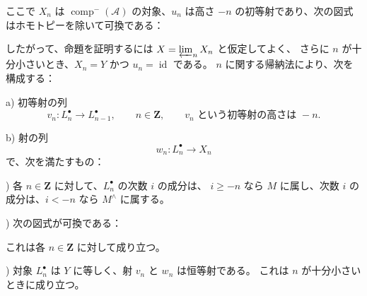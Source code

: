 \clearpage
{}%
\begingroup\small\setlength{\parskip}{0pt}\setlength{\emergencystretch}{1.5em}
\setlength{\abovedisplayskip}{4pt plus 2pt minus 2pt}%
\setlength{\belowdisplayskip}{4pt plus 2pt minus 2pt}%

ここで $X_n$ は $\operatorname{comp}^{-}(\mathcal A)$ の対象、$u_n$ は高さ
$-n$ の初等射であり、次の図式はホモトピーを除いて可換である：

\begin{center}
\end{center}

したがって、命題を証明するには $X=\varprojlim_n X_n$ と仮定してよく、
さらに $n$ が十分小さいとき、$X_n=Y$ かつ $u_n=\operatorname{id}$ である。
$n$ に関する帰納法により、次を構成する：

\noindent a) 初等射の列
\[
v_n\colon L_n^\bullet\longrightarrow L_{n-1}^\bullet,
\qquad n\in\mathbf Z,\qquad
v_n\text{ という初等射の高さは }-n.
\]

\noindent b) 射の列
\[
w_n\colon L_n^\bullet\longrightarrow X_n
\]
で、次を満たすもの：

) 各 $n\in\mathbf Z$ に対して、$L_n^\bullet$ の次数 $i$ の成分は、
$i\geq -n$ なら $M$ に属し、次数 $i$ の成分は、$i<-n$ なら $M^\wedge$ に属する。

) 次の図式が可換である：
\begin{center}
\end{center}
これは各 $n\in\mathbf Z$ に対して成り立つ。

) 対象 $L_n^\bullet$ は $Y$ に等しく、射 $v_n$ と $w_n$ は恒等射である。
これは $n$ が十分小さいときに成り立つ。
\endgroup
